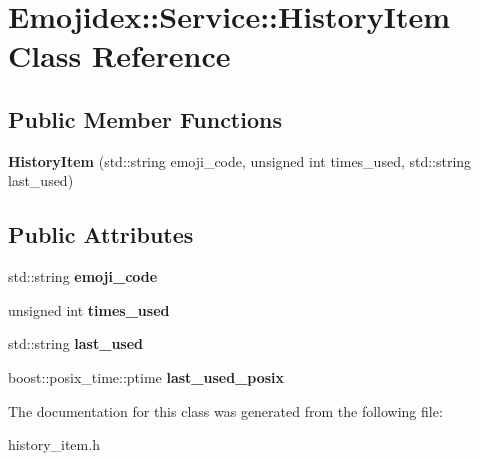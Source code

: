 \hypertarget{classEmojidex_1_1Service_1_1HistoryItem}{}\section{Emojidex\+:\+:Service\+:\+:History\+Item Class Reference}
\label{classEmojidex_1_1Service_1_1HistoryItem}
\subsection*{Public Member Functions}
\begin{DoxyCompactItemize}
\item 
{\bfseries History\+Item} (std\+::string emoji\+\_\+code, unsigned int times\+\_\+used, std\+::string last\+\_\+used)\hypertarget{classEmojidex_1_1Service_1_1HistoryItem_a83d81f8c40be75796eabea667e1d7400}{}\label{classEmojidex_1_1Service_1_1HistoryItem_a83d81f8c40be75796eabea667e1d7400}

\end{DoxyCompactItemize}
\subsection*{Public Attributes}
\begin{DoxyCompactItemize}
\item 
std\+::string {\bfseries emoji\+\_\+code}\hypertarget{classEmojidex_1_1Service_1_1HistoryItem_a98d6de7de108b4154cf4a47585af2489}{}\label{classEmojidex_1_1Service_1_1HistoryItem_a98d6de7de108b4154cf4a47585af2489}

\item 
unsigned int {\bfseries times\+\_\+used}\hypertarget{classEmojidex_1_1Service_1_1HistoryItem_a1cbf38f7c53d500fc9be47dfdeed167d}{}\label{classEmojidex_1_1Service_1_1HistoryItem_a1cbf38f7c53d500fc9be47dfdeed167d}

\item 
std\+::string {\bfseries last\+\_\+used}\hypertarget{classEmojidex_1_1Service_1_1HistoryItem_ac023cfba66fd6d1122d7d7b99009d441}{}\label{classEmojidex_1_1Service_1_1HistoryItem_ac023cfba66fd6d1122d7d7b99009d441}

\item 
boost\+::posix\+\_\+time\+::ptime {\bfseries last\+\_\+used\+\_\+posix}\hypertarget{classEmojidex_1_1Service_1_1HistoryItem_a30ffecf28921ab7593c889335789dfb1}{}\label{classEmojidex_1_1Service_1_1HistoryItem_a30ffecf28921ab7593c889335789dfb1}

\end{DoxyCompactItemize}


The documentation for this class was generated from the following file\+:\begin{DoxyCompactItemize}
\item 
history\+\_\+item.\+h\end{DoxyCompactItemize}
